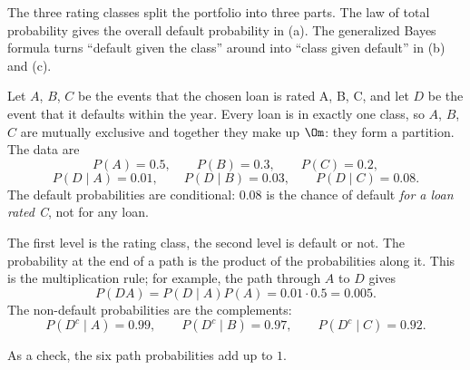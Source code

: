 \begin{solution}
	\idea The three rating classes split the portfolio into three parts. The
	law of total probability gives the overall default probability in (a). The
	generalized Bayes formula turns ``default given the class'' around into
	``class given default'' in (b) and (c).

	 Let $A$, $B$, $C$ be the events that the chosen
	loan is rated A, B, C, and let $D$ be the event that it defaults within the
	year. Every loan is in exactly one class, so $A$, $B$, $C$ are mutually
	exclusive and together they make up $\Om$: they form a partition. The data
	are
	\[ P(A)=0.5,\qquad P(B)=0.3,\qquad P(C)=0.2, \]
	\[ P(D\mid A)=0.01,\qquad P(D\mid B)=0.03,\qquad P(D\mid C)=0.08. \]
	The default probabilities are conditional: $0.08$ is the chance of default
	\emph{for a loan rated C}, not for any loan.

	 The first level is the rating class, the second level is
	default or not. The probability at the end of a path is the product of the
	probabilities along it. This is the multiplication rule; for example, the
	path through $A$ to $D$ gives
	\[ P(DA)=P(D\mid A)P(A)=0.01\cdot0.5=0.005. \]
	The non-default probabilities are the complements:
	\[ P(D^c\mid A)=0.99,\qquad P(D^c\mid B)=0.97,\qquad P(D^c\mid C)=0.92. \]
	\begin{center}
	\end{center}
	As a check, the six path probabilities add up to $1$.


\end{solution}
